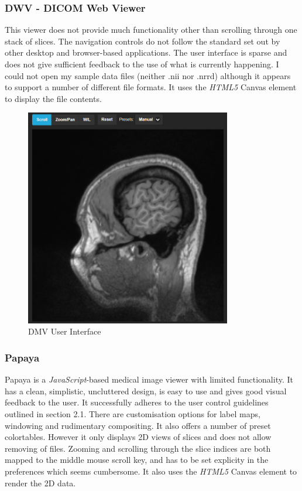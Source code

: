 \documentclass[a4paper,11pt,twoside]{article}
\begin{document}
\subsubsection{DWV - DICOM Web Viewer}
This viewer does not provide much functionality other than scrolling through one stack of slices. The navigation controls do not follow the standard set out by other desktop and browser-based applications. The user interface is sparse and does not give sufficient feedback to the use of what is currently happening. I could not open my sample data files (neither .nii nor .nrrd) although it appears to support a number of different file formats. It uses the \textit{HTML5} Canvas element to display the file contents.

\begin{figure}[ht!]
\centering
\includegraphics[width=90mm]{..//literatureSurvey/graphics/webViewer_01.png}
\caption{DMV User Interface}
\label{fig:UIdesign1}
\end{figure}



\subsubsection{Papaya}
Papaya\cite{papaya} is a \textit{JavaScript}-based medical image viewer with limited functionality. It has a clean, simplistic, uncluttered design, is easy to use and gives good visual feedback to the user. It successfully adheres to the user control guidelines outlined in section 2.1. There are customisation options for label maps, windowing and rudimentary compositing. It also offers a number of preset colortables. However it only displays 2D views of slices and does not allow removing of files. Zooming and scrolling through the slice indices are both mapped to the middle mouse scroll key, and has to be set explicity in the preferences which seems cumbersome. It also uses the \textit{HTML5} Canvas element to render the 2D data.
\end{document}
